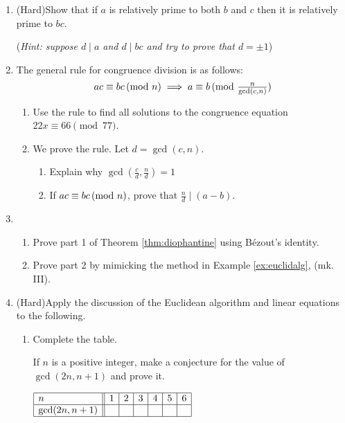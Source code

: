 \begin{exercises}{}{}
\begin{enumerate}
	    
	    \item (Hard)\lstsp Show that if $a$ is relatively prime to both $b$ and $c$ then it is relatively prime to $bc$.\par
	    (\emph{Hint: suppose $d\mid a$ and $d\mid bc$ and try to prove that $d=\pm 1$})
	    
	    
			\item\label{exs:congdivision} The general rule for congruence division is as follows:
			\[
				ac\equiv bc\negthickspace\pmod{n} \implies a\equiv b\negthickspace\pmod{\tfrac n{\gcd(c,n)}}
			\]
			\begin{enumerate}
			  \item Use the rule to find all solutions to the congruence equation $22x\equiv 66\pmod{77}$.
			  \item We prove the rule. Let $d=\gcd(c,n)$.
			  \begin{enumerate}
			    \item Explain why $\gcd(\frac cd,\frac nd)=1$
			  	\item If $ac\equiv bc\negthickspace\pmod{n}$, prove that $\frac nd\mid(a-b)$.
				\end{enumerate}
			\end{enumerate}
			
	    
	  \item\begin{enumerate}
	    \item Prove part 1 of Theorem \ref{thm:diophantine} using Bézout's identity.
	    \item Prove part 2 by mimicking the method in Example \ref{ex:euclidalg}, (mk.\,III).
	  \end{enumerate} 
	    
	    
	  \item (Hard)\lstsp Apply the discussion of the Euclidean algorithm and linear equations to the following.
	  
	  \begin{enumerate}
	    \item Complete the table.\par
	    \begin{minipage}[t]{0.55\linewidth}\vspace{-8pt}
	  	If $n$ is a positive integer, make a conjecture for the value of $\gcd(2n,n+1)$ and prove it.
	    \end{minipage}
	    \hfill
	    \begin{minipage}[t]{0.43\linewidth}\vspace{-20pt}
	    \flushright
	    $\begin{array}{|l||c|c|c|c|c|c|}
	  			\hline
	  			n&1&2&3&4&5&6\\\hline
	  			\gcd(2n,n+1)&&&&&&\\\hline
	  		\end{array}$
	    \end{minipage}
	

\end{enumerate}
\end{enumerate}
\end{exercises}
